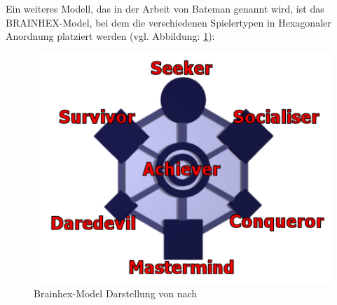 Ein weiteres Modell, das in der Arbeit von Bateman genannt wird, ist das BRAINHEX-Model, bei dem die verschiedenen Spielertypen in Hexagonaler Anordnung platziert werden (vgl. Abbildung: \ref{fig:brain-hex}):

\begin{figure}[ht]
\centering
\includegraphics[width=1\linewidth]{content/pictures/brainhex-classes.png}
\caption{Brainhex-Model Darstellung von \cite{noauthor_i_nodate} nach \cite{nacke_brainhex_2013}}
\label{fig:brain-hex}
\end{figure}





